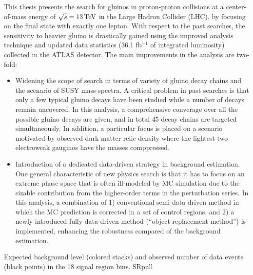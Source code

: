 \documentclass {article}
\begin{document}
This thesis presents the search for gluinos in proton-proton collisions at a center-of-mass energy of $\sqrt{s}=13\, \mathrm{TeV}$ in the Large Hadron Collider (LHC), 
by focusing on the final state with exactly one lepton. 
With respect to the past searches, the sensitivity to heavier gluino is drastically gained using the improved analysis technique and updated data statistics (36.1 fb$^{-1}$ of integrated luminosity) collected in the ATLAS detector.  The main improvements in the analysis are two-fold: 
\begin{itemize}
\item Widening the scope of search in terms of variety of gluino decay chains and the scenario of SUSY mass spectra.
A critical problem in past searches is that only a few typical gluino decays have been studied while a number of decays remain uncovered.
In this analysis, a comprehensive converage over all the possible gluino decays are given, and in total 45 decay chains are targeted simultaneously.
In addition, a particular focus is placed on a scenario motivated by observed dark matter relic density where the lightest two electroweak gauginos have the masses comppressed.

\item Introduction of a dedicated data-driven strategy in background estimation.
One general characteristic of new physics search is that it has to focus on an extreme phase space that is often ill-modeled by MC simulation due to the sizable contribution from the higher-order terms in the perturbation series.
In this analysis, a combination of 1) conventional semi-data driven method in which the MC prediction is corrected in a set of control regions, and 2) a newly introduced fully data-driven method (``object replacement method'') is implemented, enhancing the robustness compared of the background estimation. \\
\end{itemize}


{Expected background level (colored stacks) and observed number of data events (black points) in the 18 signal region bins.}
{SRpull}
\end{document}
